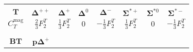 \documentclass[preprintnumbers,prd,superscriptaddress,preprint]{revtex4-1}
\begin{document}
\begin{table}[b]
\begin{center}
{\begin{tabular}{c|ccccccc}
\\ 
&&&&&&& \\
\hline
&&&&&&& \\
\hspace*{0.1cm}$\bm T$\hspace*{0.1cm}
& \hspace*{0.1cm}$\bm \Delta^{++}$\hspace*{0.1cm}
& \hspace*{0.1cm}$\bm \Delta^+$\hspace*{0.1cm}
& \hspace*{0.1cm}$\bm \Delta^0$\hspace*{0.1cm}
& \hspace*{0.1cm}$\bm \Delta^-$ \hspace*{0.1cm}
& \hspace*{0.1cm}$\bm \Sigma^{*+}$\hspace*{0.1cm}
& \hspace*{0.1cm}$\bm \Sigma^{*0}$\hspace*{0.1cm}
& \hspace*{0.1cm}$\bm \Sigma^{*-}$\hspace*{0.1cm}
\\
\hspace*{0.1cm}$C_T^{\text {mag}}$\hspace*{0.1cm}
& \hspace*{0.1cm}$\frac23 F_2^T$\hspace*{0.1cm}
& \hspace*{0.1cm}$\frac13 F_2^T$\hspace*{0.1cm}
& \hspace*{0.1cm}$0$\hspace*{0.1cm}
& \hspace*{0.1cm}$-\frac13 F_2^T$\hspace*{0.1cm}
& \hspace*{0.1cm}$\frac13 F_2^T$\hspace*{0.1cm}
& \hspace*{0.1cm}$0$\hspace*{0.1cm}
& \hspace*{0.1cm}$-\frac13 F_2^T$\hspace*{0.1cm}	
\\ 
&&&&&&& \\
\hline
&&&&&&& \\
\hspace*{0.1cm}$\bm{BT}$\hspace*{0.1cm}
& \hspace*{0.1cm}$\bm{p\Delta^+}$\hspace*{0.1cm}

\end{tabular}}
\end{center}
\end{table}
\end{document}
